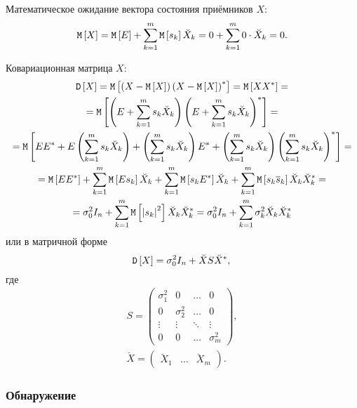Математическое ожидание вектора состояния приёмников $X$:
\[
    \mathtt{M} \left [ X \right ]
    = \mathtt{M} \left [ E \right ] + \sum_{k=1}^m \mathtt{M} \left [ s_k \right ] \breve{X}_k
    = 0 + \sum_{k=1}^m 0 \cdot \breve{X}_k
    = 0.
\]

Ковариационная матрица $X$:
\begin{multline*}
    \mathtt{D} \left [ X \right ]
    = \mathtt{M} \left [ \left ( X - \mathtt{M} \left [ X \right ] \right ) \left ( X - \mathtt{M} \left [ X \right ] \right )^* \right ]
    = \mathtt{M} \left [ X X^* \right ] = \\
    = \mathtt{M} \left [ \left ( E + \sum_{k=1}^m s_k \breve{X}_k \right ) \left ( E + \sum_{k=1}^m s_k \breve{X}_k \right )^* \right ] = \\
    = \mathtt{M} \left [ E E^* + E \left ( \sum_{k=1}^m s_k \breve{X}_k \right ) + \left ( \sum_{k=1}^m s_k \breve{X}_k \right ) E^* + \left ( \sum_{k=1}^m s_k \breve{X}_k \right ) \left ( \sum_{k=1}^m s_k \breve{X}_k \right )^* \right ] = \\
    = \mathtt{M} \left [ E E^* \right ] + \sum_{k=1}^m \mathtt{M} \left [ E s_k \right ] \breve{X}_k + \sum_{k=1}^m \mathtt{M} \left [ s_k E^* \right ] \breve{X}_k + \sum_{k=1}^m \mathtt{M} \left [ s_k \overline{s}_k \right ] \breve{X}_k \breve{X}_k^* = \\
    = \sigma_0^2 I_n + \sum_{k=1}^m \mathtt{M} \left [ \left | s_k \right |^2 \right ] \breve{X}_k \breve{X}_k^*
    = \sigma_0^2 I_n + \sum_{k=1}^m \sigma_k^2 \breve{X}_k \breve{X}_k^*
\end{multline*}
или в матричной форме
\[
    \mathtt{D} \left [ X \right ] = \sigma_0^2 I_n + \breve{X} S \breve{X}^* , \\
\]
где
\begin{gather*}
    S =
    \begin{pmatrix}
        \sigma_1^2 & 0          & \dots  & 0          \\
        0          & \sigma_2^2 & \dots  & 0          \\
        \vdots     & \vdots     & \ddots & \vdots     \\
        0          & 0          & \dots  & \sigma_m^2
    \end{pmatrix}, \\
    \breve{X} =
    \begin{pmatrix}
        \breve{X}_1 & \dots & \breve{X}_m
    \end{pmatrix} .
\end{gather*}

\subsubsection{Обнаружение}

